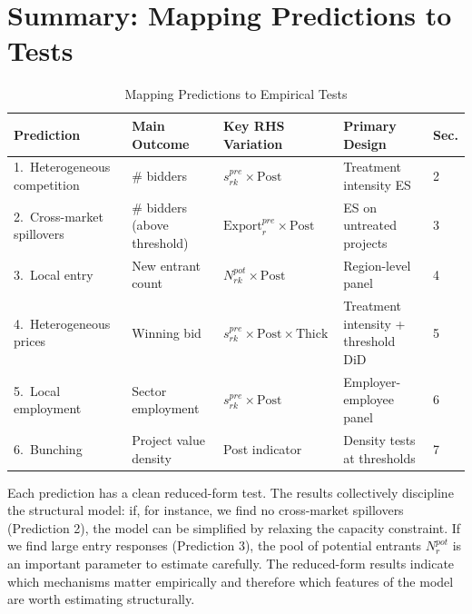 \documentclass[12pt]{article}
\begin{document}
\section{Summary: Mapping Predictions to Tests}

\begin{table}[htbp]
\centering
\caption{Mapping Predictions to Empirical Tests}
\label{tab:summary}
\small
\begin{tabular}{@{}p{3.2cm}p{2.5cm}p{3.2cm}p{3.8cm}p{1cm}@{}}
\toprule
\textbf{Prediction} & \textbf{Main Outcome} & \textbf{Key RHS Variation} & \textbf{Primary Design} & \textbf{Sec.} \\
\midrule
1.\ Heterogeneous competition & \# bidders & $s_{rk}^{pre} \times \text{Post}$ & Treatment intensity ES & 2 \\[4pt]
2.\ Cross-market spillovers & \# bidders (above threshold) & $\text{Export}_r^{pre} \times \text{Post}$ & ES on untreated projects & 3 \\[4pt]
3.\ Local entry & New entrant count & $N_{rk}^{pot} \times \text{Post}$ & Region-level panel & 4 \\[4pt]
4.\ Heterogeneous prices & Winning bid & $s_{rk}^{pre} \times \text{Post} \times \text{Thick}$ & Treatment intensity + threshold DiD & 5 \\[4pt]
5.\ Local employment & Sector employment & $s_{rk}^{pre} \times \text{Post}$ & Employer-employee panel & 6 \\[4pt]
6.\ Bunching & Project value density & Post indicator & Density tests at thresholds & 7 \\
\bottomrule
\end{tabular}
\end{table}

Each prediction has a clean reduced-form test. The results collectively discipline the structural model: if, for instance, we find no cross-market spillovers (Prediction 2), the model can be simplified by relaxing the capacity constraint. If we find large entry responses (Prediction 3), the pool of potential entrants $N_r^{pot}$ is an important parameter to estimate carefully. The reduced-form results indicate which mechanisms matter empirically and therefore which features of the model are worth estimating structurally.
\end{document}
